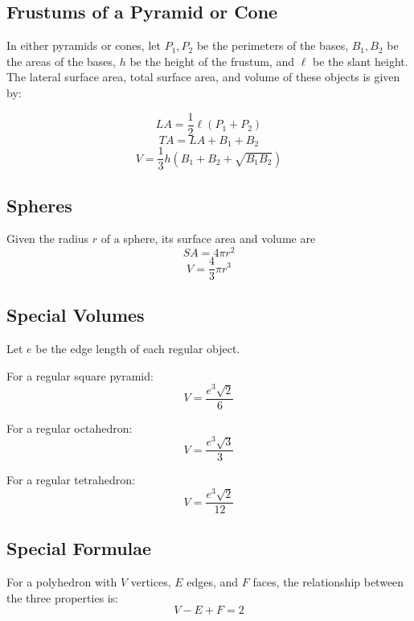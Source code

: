 \documentclass[final, letterpaper, 12pt]{article}
\begin{document}
	\subsection{Frustums of a Pyramid or Cone}\label{sec: the special formulae relating to frustums}
		In either pyramids or cones, let $P_1, P_2$ be the perimeters of the bases, $B_1, B_2$ be the areas of the bases, $h$ be the height of the frustum, and $\ell$ be the slant height. The lateral surface area, total surface area, and volume of these objects is given by:
		
		\begin{equation}
			LA = \frac{1}{2}{\ell}(P_1 + P_2)
		\end{equation}
		\begin{equation}
			TA = LA + B_1 + B_2
		\end{equation}
		\begin{equation}
			V = \frac{1}{3}h\left(B_1 + B_2 + \sqrt{B_1 B_2}\right)
		\end{equation}
	\subsection{Spheres}\label{sec: properties of a sphere}
	Given the radius $r$ of a sphere, its surface area and volume are
		\begin{equation}
			SA = 4\pi r^2
		\end{equation}
		\begin{equation}
			V = \frac{4}{3}\pi r^3
		\end{equation}
	\subsection{Special Volumes}\label{sec: volumes of regular square pyramid, regular octahedron, regular tetrahedron}
		Let $e$ be the edge length of each regular object.
		
		For a regular square pyramid:
		\begin{equation}
			V = \frac{e^3\sqrt{2}}{6}
		\end{equation}
		
		For a regular octahedron:
		\begin{equation}
			V = \frac{e^3\sqrt{3}}{3}
		\end{equation}
		
		For a regular tetrahedron:
		\begin{equation}
			V = \frac{e^3\sqrt{2}}{12}
		\end{equation}
	\subsection{Special Formulae}\label{sec: euler's formula for polyhedra and solid similarity}
		For a polyhedron with $V$ vertices, $E$ edges, and $F$ faces, the relationship between the three properties is:
		\begin{equation}
			V - E + F = 2
		\end{equation}
		
\end{document}
